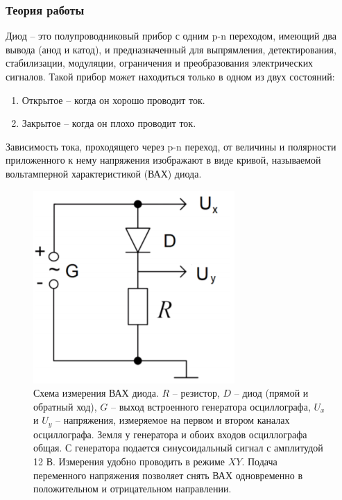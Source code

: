\documentclass[a4paper,14pt]{extarticle}
\begin{document}
			\subsubsection{Теория работы}
				Диод – это полупроводниковый прибор с одним p-n переходом, имеющий два	вывода (анод и катод), и предназначенный для выпрямления, детектирования, стабилизации, модуляции, ограничения и преобразования электрических сигналов. Такой прибор может находиться только в одном из двух состояний: 
				\begin{enumerate}
					\item Открытое – когда он хорошо проводит ток.
					\item Закрытое – когда он плохо проводит ток.
				\end{enumerate}
				Зависимость тока, проходящего через p-n переход, от величины и полярности приложенного к нему напряжения изображают в виде кривой, называемой вольтамперной характеристикой (ВАХ) диода.
				\begin{figure}[h]
					\centering
					\includegraphics[width=.40\linewidth]{схема2.png}
					\caption{Схема измерения ВАХ диода. $R$ – резистор, $D$ – диод (прямой и обратный ход), $G$ – выход встроенного генератора осциллографа, $U_x$ и $U_y$ – напряжения, измеряемое на первом и втором каналах осциллографа. Земля у генератора и обоих входов осциллографа общая. С генератора подается синусоидальный сигнал с амплитудой 12 В. Измерения удобно проводить в режиме $XY$. Подача переменного напряжения позволяет снять ВАХ одновременно в положительном и отрицательном направлении.}
					\label{fig3}
				\end{figure}
\end{document}
